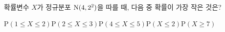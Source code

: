 확률변수 $X$가 정규분포 $\mathrm{N}(4{,}\mkern3mu\mathopen{}2^2)$을 따를 때, 다음 중 확률이 가장 작은 것은? 
\begin{choices32}{$\mathrm{P}(1\le X\le 2)$}{$\mathrm{P}(2\le X\le 3)$}{$\mathrm{P}(4\le X\le 5)$}{$\mathrm{P}(X\le 2)$}{$\mathrm{P}(X\ge 7)$}\end{choices32}
